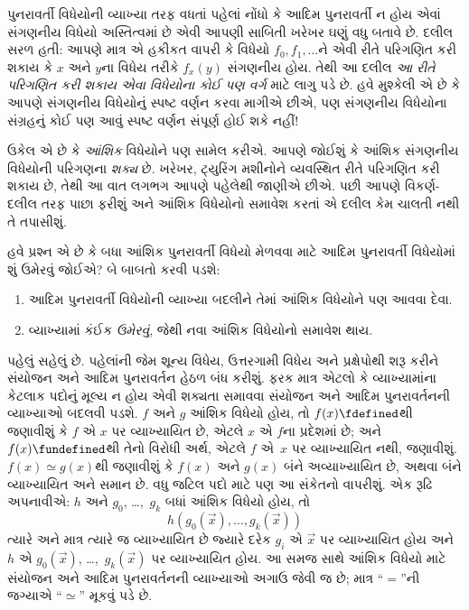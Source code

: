 \begingroup
\makeatletter{}\makeatother

\label{guunit:OLP-0224}



પુનરાવર્તી વિધેયોની વ્યાખ્યા તરફ વધતાં પહેલાં નોંધો કે આદિમ
પુનરાવર્તી ન હોય એવાં સંગણનીય વિધેયો અસ્તિત્વમાં છે એવી આપણી
સાબિતી ખરેખર ઘણું વધુ બતાવે છે. દલીલ સરળ હતી: આપણે માત્ર એ
હકીકત વાપરી કે વિધેયો $f_0,f_1,\dots$ને એવી રીતે પરિગણિત કરી
શકાય કે $x$ અને $y$ના વિધેય તરીકે $f_x(y)$ સંગણનીય હોય. તેથી
આ દલીલ \emph{આ રીતે પરિગણિત કરી શકાય એવા વિધેયોના કોઈ પણ વર્ગ}
માટે લાગુ પડે છે. હવે મુશ્કેલી એ છે કે આપણે સંગણનીય વિધેયોનું
સ્પષ્ટ વર્ણન કરવા માગીએ છીએ, પણ સંગણનીય વિધેયોના સંગ્રહનું કોઈ
પણ આવું સ્પષ્ટ વર્ણન સંપૂર્ણ હોઈ શકે નહીં!

ઉકેલ એ છે કે \emph{આંશિક} વિધેયોને પણ સામેલ કરીએ. આપણે જોઈશું કે
આંશિક સંગણનીય વિધેયોની પરિગણના \emph{શક્ય} છે.
 ખરેખર, ટ્યુરિંગ મશીનોને વ્યવસ્થિત રીતે પરિગણિત
  કરી શકાય છે, તેથી આ વાત લગભગ આપણે પહેલેથી જાણીએ છીએ.
પછી આપણે વિકર્ણ-દલીલ તરફ પાછા ફરીશું અને આંશિક વિધેયોનો
સમાવેશ કરતાં એ દલીલ કેમ ચાલતી નથી તે તપાસીશું.

હવે પ્રશ્ન એ છે કે બધા આંશિક પુનરાવર્તી વિધેયો મેળવવા માટે
આદિમ પુનરાવર્તી વિધેયોમાં શું ઉમેરવું જોઈએ? બે બાબતો કરવી પડશે:
\begin{enumerate}
\item આદિમ પુનરાવર્તી વિધેયોની વ્યાખ્યા બદલીને તેમાં આંશિક
  વિધેયોને પણ આવવા દેવા.
\item વ્યાખ્યામાં કંઈક \emph{ઉમેરવું}, જેથી નવા આંશિક વિધેયોનો
  સમાવેશ થાય.
\end{enumerate}

પહેલું સહેલું છે. પહેલાંની જેમ શૂન્ય વિધેય, ઉત્તરગામી વિધેય અને
પ્રક્ષેપોથી શરૂ કરીને સંયોજન અને આદિમ પુનરાવર્તન હેઠળ બંધ કરીશું.
ફરક માત્ર એટલો કે વ્યાખ્યામાંના કેટલાક પદોનું મૂલ્ય ન હોય એવી
શક્યતા સમાવવા સંયોજન અને આદિમ પુનરાવર્તનની વ્યાખ્યાઓ બદલવી પડશે.
$f$ અને $g$ આંશિક વિધેયો હોય, તો $f(x) \fdefined$થી જણાવીશું કે
$f$ એ $x$ પર વ્યાખ્યાયિત છે, એટલે $x$ એ $f$ના પ્રદેશમાં છે;
અને $f(x)
\fundefined$થી તેનો વિરોધી અર્થ, એટલે $f$ એ~$x$ પર
વ્યાખ્યાયિત નથી, જણાવીશું. $f(x) \simeq g(x)$થી જણાવીશું કે
$f(x)$ અને $g(x)$ બંને અવ્યાખ્યાયિત છે, અથવા બંને વ્યાખ્યાયિત
અને સમાન છે. વધુ જટિલ પદો માટે પણ આ સંકેતનો વાપરીશું. એક
રૂઢિ અપનાવીએ: $h$ અને $g_0$, \dots,~$g_k$ બધાં આંશિક
વિધેયો હોય, તો
\[
h(g_0(\vec x),\dots,g_k(\vec x))
\]
ત્યારે અને માત્ર ત્યારે જ વ્યાખ્યાયિત છે જ્યારે દરેક $g_i$ એ
$\vec x$ પર વ્યાખ્યાયિત હોય અને $h$ એ
$g_0(\vec x)$, \dots,~$g_k(\vec x)$ પર વ્યાખ્યાયિત હોય. આ
સમજ સાથે આંશિક વિધેયો માટે સંયોજન અને આદિમ પુનરાવર્તનની
વ્યાખ્યાઓ અગાઉ જેવી જ છે; માત્ર ``$=$''ની જગ્યાએ
``$\simeq$'' મૂકવું પડે છે.

